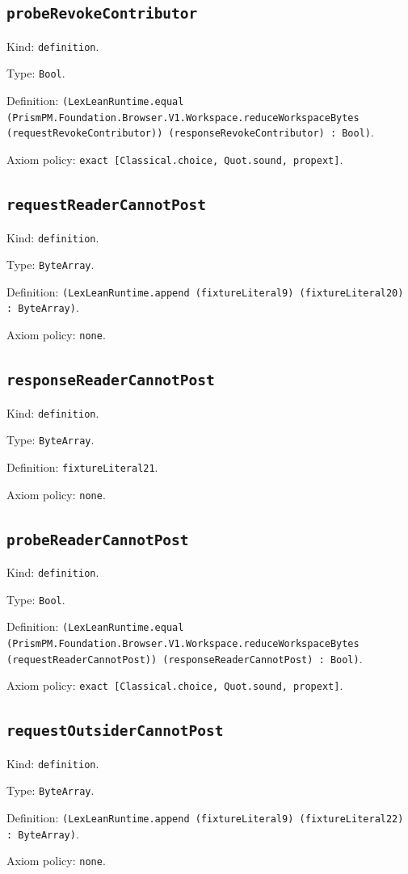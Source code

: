 \documentclass[11pt]{article}
\begin{document}
\subsection*{\texttt{probeRevokeContributor}}
\noindent Kind: \texttt{definition}.\par
\noindent Type: \texttt{Bool}.\par
\noindent Definition: \texttt{(LexLeanRuntime.equal (PrismPM.Foundation.Browser.V1.Workspace.reduceWorkspaceBytes (requestRevokeContributor)) (responseRevokeContributor) : Bool)}.\par
\noindent Axiom policy: \texttt{exact [Classical.choice, Quot.sound, propext]}.\par
\subsection*{\texttt{requestReaderCannotPost}}
\noindent Kind: \texttt{definition}.\par
\noindent Type: \texttt{ByteArray}.\par
\noindent Definition: \texttt{(LexLeanRuntime.append (fixtureLiteral9) (fixtureLiteral20) : ByteArray)}.\par
\noindent Axiom policy: \texttt{none}.\par
\subsection*{\texttt{responseReaderCannotPost}}
\noindent Kind: \texttt{definition}.\par
\noindent Type: \texttt{ByteArray}.\par
\noindent Definition: \texttt{fixtureLiteral21}.\par
\noindent Axiom policy: \texttt{none}.\par
\subsection*{\texttt{probeReaderCannotPost}}
\noindent Kind: \texttt{definition}.\par
\noindent Type: \texttt{Bool}.\par
\noindent Definition: \texttt{(LexLeanRuntime.equal (PrismPM.Foundation.Browser.V1.Workspace.reduceWorkspaceBytes (requestReaderCannotPost)) (responseReaderCannotPost) : Bool)}.\par
\noindent Axiom policy: \texttt{exact [Classical.choice, Quot.sound, propext]}.\par
\subsection*{\texttt{requestOutsiderCannotPost}}
\noindent Kind: \texttt{definition}.\par
\noindent Type: \texttt{ByteArray}.\par
\noindent Definition: \texttt{(LexLeanRuntime.append (fixtureLiteral9) (fixtureLiteral22) : ByteArray)}.\par
\noindent Axiom policy: \texttt{none}.\par
\end{document}
